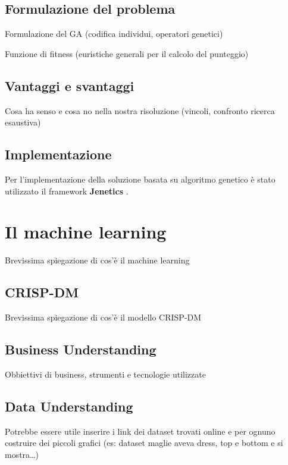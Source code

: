 \documentclass[a4paper, 11pt, oneside]{report}
\begin{document}
            \section{Formulazione del problema}
            Formulazione del GA (codifica individui, operatori genetici)
            \par \noindent Funzione di fitness (euristiche generali per il calcolo del punteggio)
            \par {}

            \section{Vantaggi e svantaggi}
            Cosa ha senso e cosa no nella nostra risoluzione (vincoli, confronto ricerca esaustiva)
            \par {}

            \section{Implementazione}
            Per l'implementazione della soluzione basata su algoritmo genetico è stato utilizzato il framework
            \textbf{Jenetics} \cite{1}.

        \chapter{Il machine learning}
        Brevissima spiegazione di cos'è il machine learning

            \section{CRISP-DM}
            Brevissima spiegazione di cos'è il modello CRISP-DM
            \par {}

            \section{Business Understanding}
            Obbiettivi di business, strumenti e tecnologie utilizzate

            \section{Data Understanding}
            Potrebbe essere utile inserire i link dei dataset trovati online e per ognuno costruire dei piccoli grafici
            (es: dataset maglie aveva dress, top e bottom e si mostra\ldots)
\end{document}
